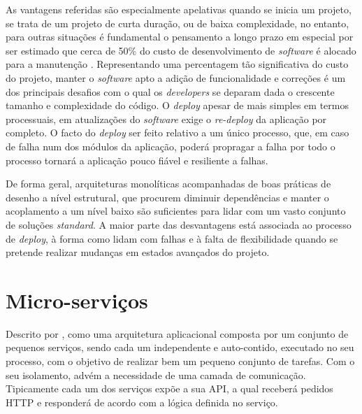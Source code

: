     As vantagens referidas são especialmente apelativas quando se inicia um projeto, se trata de um projeto de curta duração, ou de baixa complexidade, no entanto, para outras situações é fundamental o pensamento a longo prazo em especial por ser estimado que cerca de 50\% do custo de desenvolvimento de \textit{software} é alocado para a manutenção \citep{software_maintenance_cost_alija_17}. Representando uma percentagem tão significativa do custo do projeto, manter o \textit{software} apto a adição de funcionalidade e correções é um dos principais desafios com o qual os \textit{developers} se deparam dada o crescente tamanho e complexidade do código. O \textit{deploy} apesar de mais simples em termos processuais, em atualizações do \textit{software} exige o \textit{re-deploy} da aplicação por completo. O facto do \textit{deploy} ser feito relativo a um único processo, que, em caso de falha num dos módulos da aplicação, poderá propragar a falha por todo o processo tornará a aplicação pouco fiável e resiliente a falhas.
    
    De forma geral, arquiteturas monolíticas acompanhadas de boas práticas de desenho a nível estrutural, que procurem diminuir dependências e manter o acoplamento a um nível baixo são suficientes para lidar com um vasto conjunto de soluções \textit{standard}. A maior parte das desvantagens está associada ao processo de \textit{deploy}, à forma como lidam com falhas e à falta de flexibilidade quando se pretende realizar mudanças em estados avançados do projeto. 
    
    
    

\section{Micro-serviços}


    Descrito por \cite{fowler_lewis_monolith_microservices}, como uma arquitetura aplicacional composta por um conjunto de pequenos serviços, sendo cada um independente e auto-contido, executado no seu processo, com o objetivo de realizar bem um pequeno conjunto de tarefas. Com o seu isolamento, advém a necessidade de uma camada de comunicação. Tipicamente cada um dos serviços expõe a sua API, a qual receberá pedidos HTTP e responderá de acordo com a lógica definida no serviço.
    

